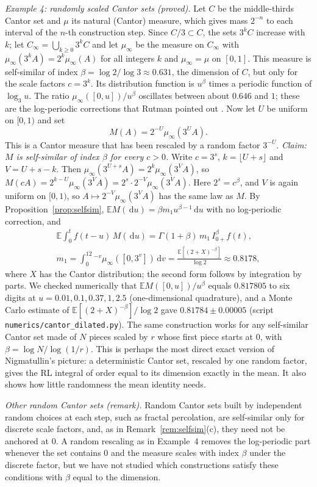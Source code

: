 \documentclass[11pt]{article}
\theoremstyle{remark}
\theoremstyle{definition}
\newcommand{\E}{\mathbb{E}}
\newcommand{\dd}{\,\mathrm{d}}
\begin{document}
\emph{Example 4: randomly scaled Cantor sets (proved).} Let $C$ be the middle-thirds Cantor set and $\mu$ its natural (Cantor) measure, which gives mass $2^{-n}$ to each interval of the $n$-th construction step. Since $C/3\subset C$, the sets $3^kC$ increase with $k$; let $C_\infty=\bigcup_{k\ge0}3^kC$ and let $\mu_\infty$ be the measure on $C_\infty$ with $\mu_\infty(3^kA)=2^k\mu_\infty(A)$ for all integers $k$ and $\mu_\infty=\mu$ on $[0,1]$. This measure is self-similar of index $\beta=\log2/\log3\approx0.631$, the dimension of $C$, but only for the scale factors $c=3^k$. Its distribution function is $u^\beta$ times a periodic function of $\log_3u$. The ratio $\mu_\infty([0,u])/u^\beta$ oscillates between about $0.646$ and $1$; these are the log-periodic corrections that Rutman pointed out \cite{Rut94,Rut95}. Now let $U$ be uniform on $[0,1)$ and set
\[
M(A)=2^{-U}\mu_\infty(3^UA).
\]
This is a Cantor measure that has been rescaled by a random factor $3^{-U}$. \emph{Claim: $M$ is self-similar of index $\beta$ for every $c>0$.} Write $c=3^s$, $k=\lfloor U+s\rfloor$ and $V=U+s-k$. Then $\mu_\infty(3^{U+s}A)=2^k\mu_\infty(3^VA)$, so $M(cA)=2^{k-U}\mu_\infty(3^VA)=2^s\cdot2^{-V}\mu_\infty(3^VA)$. Here $2^s=c^\beta$, and $V$ is again uniform on $[0,1)$, so $A\mapsto2^{-V}\mu_\infty(3^VA)$ has the same law as $M$. By Proposition~\ref{prop:selfsim}, $\E M(\dd u)=\beta m_1u^{\beta-1}\dd u$ with no log-periodic correction, and
\begin{gather*}
\E\int_0^t f(t-u)\,M(\dd u)=\Gamma(1+\beta)\,m_1\,I^\beta_{0+}f(t),\\
m_1=\int_0^12^{-v}\mu_\infty([0,3^v])\dd v=\frac{\E[(2+X)^{-\beta}]}{\log 2}\approx0.8178,
\end{gather*}
where $X$ has the Cantor distribution; the second form follows by integration by parts. We checked numerically that $\E M([0,u])/u^\beta$ equals $0.817805$ to six digits at $u=0.01,0.1,0.37,1,2.5$ (one-dimensional quadrature), and a Monte Carlo estimate of $\E[(2+X)^{-\beta}]/\log2$ gave $0.81784\pm0.00005$ (script \texttt{numerics/cantor\_dilated.py}). The same construction works for any self-similar Cantor set made of $N$ pieces scaled by $r$ whose first piece starts at $0$, with $\beta=\log N/\log(1/r)$. This is perhaps the most direct exact version of Nigmatullin's picture: a deterministic Cantor set, rescaled by one random factor, gives the RL integral of order equal to its dimension exactly in the mean. It also shows how little randomness the mean identity needs.

\emph{Other random Cantor sets (remark).} Random Cantor sets built by independent random choices at each step, such as fractal percolation, are self-similar only for discrete scale factors, and, as in Remark~\ref{rem:selfsim}(c), they need not be anchored at $0$. A random rescaling as in Example~4 removes the log-periodic part whenever the set contains $0$ and the measure scales with index $\beta$ under the discrete factor, but we have not studied which constructions satisfy these conditions with $\beta$ equal to the dimension.
\end{document}
